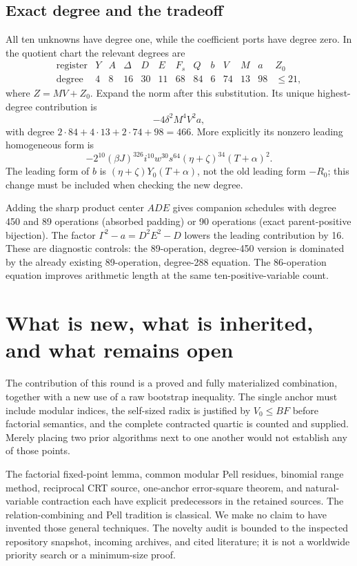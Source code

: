 \documentclass[11pt,letterpaper]{article}
\theoremstyle{remark}\newtheorem{remark}[theorem]{Remark}
\begin{document}
\subsection{Exact degree and the tradeoff}

All ten unknowns have degree one, while the coefficient ports have degree
zero.  In the quotient chart the relevant degrees are
\[
 \begin{array}{c|rrrrrrrrrrrr}
 \text{register}&Y&A&\Delta&D&E&F_s&Q&b&V&M&a&Z_0\\\hline
 \text{degree}&4&8&16&30&11&68&84&6&74&13&98&\le21,
 \end{array}
\]
where $Z=MV+Z_0$.  Expand the norm after this substitution.  Its unique
highest-degree contribution is
\[
 -4\delta^2M^4V^2a,
\]
with degree $2\cdot84+4\cdot13+2\cdot74+98=466$.  More explicitly its
nonzero leading homogeneous form is
\[
 -2^{10}(\beta J)^{326}i^{10}w^{30}s^{64}
       (\eta+\zeta)^{34}(T+\alpha)^2.
\]
The leading form of $b$ is
$(\eta+\zeta)Y_0(T+\alpha)$, not the old leading form $-R_0$; this change
must be included when checking the new degree.

Adding the sharp product center $ADE$ gives companion schedules with
degree 450 and 89 operations (absorbed padding) or 90 operations (exact
parent-positive bijection).  The factor $\Gamma^2-a=D^2E^2-D$ lowers
the leading contribution by 16.  These are diagnostic controls: the
89-operation, degree-450 version is dominated by the already existing
89-operation, degree-288 equation.  The 86-operation equation improves
arithmetic length at the same ten-positive-variable count.


\section{What is new, what is inherited, and what remains open}

The contribution of this round is a proved and fully materialized
combination, together with a new use of a raw bootstrap inequality.  The single anchor
must include modular indices, the self-sized radix is justified by
$V_0\le BF$ before factorial semantics, and the complete contracted
quartic is counted and supplied.  Merely placing two prior algorithms
next to one another would not establish any of those points.

The factorial fixed-point lemma, common modular Pell residues, binomial
range method, reciprocal CRT source, one-anchor error-square theorem,
and natural-variable contraction each have explicit predecessors in
the retained sources.  The relation-combining and Pell tradition is
classical.  We make no claim to have invented those general techniques.
The novelty audit is bounded to the inspected repository snapshot,
incoming archives, and cited literature; it is not a worldwide
priority search or a minimum-size proof.
\end{document}
